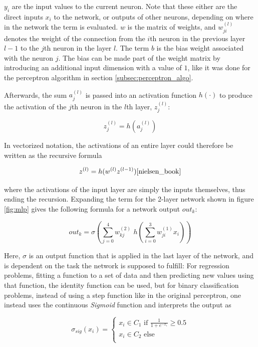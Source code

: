 \noindent $y_i$ are the input values to the current neuron. Note that these either are the direct inputs $x_i$ to the network, or outputs of other neurons, depending on where in the network the term is evaluated. $w$ is the matrix of weights, and $w^{(l)}_{ji}$ denotes the weight of the connection from the $i$th neuron in the previous layer $l - 1$ to the $j$th neuron in the  layer $l$. The term $b$ is the bias weight associated with the neuron $j$. The bias can be made part of the weight matrix by introducing an additional input dimension with a value of $1$, like it was done for the perceptron algorithm in section \ref{subsec:perceptron_algo}.

Afterwards, the sum $a^{(l)}_j$ is passed into an activation function $h(\cdot)$ to produce the activation of the $j$th neuron in the $l$th layer, $z_j^{(l)}$:

\[ z_j^{(l)} = h(a^{(l)}_j) \]

\noindent In vectorized notation, the activations of an entire layer could therefore be written as the recursive formula

\[ z^{(l)} = h(w^{(l)} z^{(l-1)}) \cite{nielsen_book} \]

\noindent where the activations of the input layer are simply the inputs themselves, thus ending the recursion. Expanding the term for the 2-layer network shown in figure \ref{fig:mlp} gives the following formula for a network output $out_k$:

\[ out_k = \sigma \left ( \sum \limits_{j=0}^{4} w^{(2)}_{kj}\,\, h \left ( \sum \limits_{i=0}^{3} w^{(1)}_{ji} x_i \right ) \right ) \label{eq:mlp_out} \]

\noindent Here, \textbf{$\sigma$} is an output function that is applied in the last layer of the network, and is dependent on the task the network is supposed to fulfill: For regression problems, fitting a function to a set of data and then predicting new values using that function, the identity function can be used, but for binary classification problems, instead of using a step function like in the original perceptron, one instead uses the continuous \textit{Sigmoid} function and interprets the output as

\[ \sigma_{sig}(x_i) = \begin{cases}
				x_i \in C_1 \text{ if } \frac{1}{1 + e^{-x_i}} \geq 0.5 \\
				x_i \in C_2 \text{ else }\\
			 \end{cases}
\]

